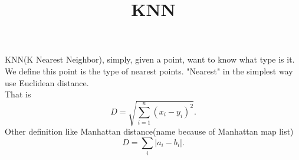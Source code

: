 \documentclass[12pt]{article}
\title{KNN}
\theoremstyle{definition}
\begin{document}
KNN(K Nearest Neighbor), simply, given a point, want to know what type is it. We define this point is the type of nearest points. "Nearest" in the simplest way use Euclidean distance.\\
That is
\[
	D = \sqrt{\sum_{i=1}^{n}(x_{i}-y_{i})^{2}}
.\] 
Other definition like Manhattan distance(name because of Manhattan map list)
\[
	D = \sum_{i}|a_{i} - b_{i}|
.\] 
\end{document}
